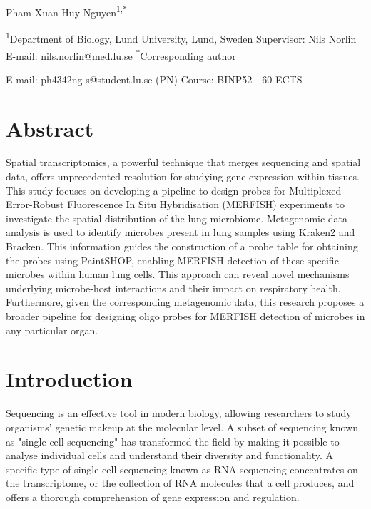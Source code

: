 \documentclass[10pt,letterpaper]{article}
\begin{document}
\vspace*{0.2in}

\begin{flushleft}
{\Large
\begin{center}
\textbf{}
\end{center}
}
\bigskip
\bigskip
Pham Xuan Huy Nguyen\textsuperscript{1,*}

\bigskip
\textsuperscript{1}Department of Biology, Lund University, Lund, Sweden
\bigskip
\newline
\newline
Supervisor: Nils Norlin
\bigskip
\newline
E-mail: nils.norlin@med.lu.se
\bigskip
\newline
\newline
\textsuperscript{*}Corresponding author

\bigskip
E-mail: ph4342ng-s@student.lu.se (PN)
\bigskip
\newline
\newline
Course: BINP52 - 60 ECTS



\end{flushleft}
\newpage
\justifying
\section*{Abstract}
Spatial transcriptomics, a powerful technique that merges sequencing and spatial data, offers unprecedented resolution for studying gene expression within tissues. This study focuses on developing a pipeline to design probes for Multiplexed Error-Robust Fluorescence In Situ Hybridisation (MERFISH) experiments to investigate the spatial distribution of the lung microbiome. Metagenomic data analysis is used to identify microbes present in lung samples using Kraken2 and Bracken. This information guides the construction of a probe table for obtaining the probes using PaintSHOP, enabling MERFISH detection of these specific microbes within human lung cells. This approach can reveal novel mechanisms underlying microbe-host interactions and their impact on respiratory health. Furthermore, given the corresponding metagenomic data, this research proposes a broader pipeline for designing oligo probes for MERFISH detection of  microbes in any particular organ.
\linenumbers
\section*{Introduction}
Sequencing is an effective tool in modern biology, allowing researchers to study organisms' genetic makeup at the molecular level. A subset of sequencing known as "single-cell sequencing" has transformed the field by making it possible to analyse individual cells and understand their diversity and functionality. A specific type of single-cell sequencing known as RNA sequencing concentrates on the transcriptome, or the collection of RNA molecules that a cell produces, and offers a thorough comprehension of gene expression and regulation.  
\end{document}
